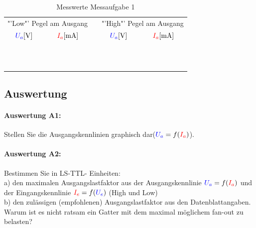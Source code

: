 \documentclass[11pt,a4paper,titlepage,parskip=half]{scrreprt}
\begin{document}
          \begin{center}
            \begin{table}[H]
              \caption{Messwerte Messaufgabe 1}
              \renewcommand{\arraystretch}{1.6}
              \begin{center}
                \begin{tabular}{c|c|c|c|c}
                  \multicolumn{2}{c|}{"'Low"' Pegel am Ausgang} &&\multicolumn{2}{c}{"'High"' Pegel am Ausgang}\\
                  $\textcolor{blue}{U_a} [\si{\volt}]$ & $\textcolor{red}{I_a} [\si{\milli\ampere}] $&& $\textcolor{blue}{U_a} [\si{\volt}]$ & $\textcolor{red}{I_a} [\si{\milli\ampere}] $\\ \hline
                  \qquad\qquad\qquad\qquad & \qquad\qquad\qquad\qquad &  & \qquad\qquad\qquad\qquad & \qquad\qquad\qquad\qquad\\\hline
                   &  &  &  & \\\hline
                   &  &  &  & \\\hline
                   &  &  &  & \\\hline
                   &  &  &  & \\\hline
                   &  &  &  & \\\hline
                   &  &  &  & \\\hline
                   &  &  &  & \\\hline
                   &  &  &  & \\\hline
                   &  &  &  & \\\hline
                   &  &  & &
                \end{tabular}
              \end{center}
            \end{table}
          \end{center}


      \subsection{Auswertung}
        \paragraph{Auswertung A1:} Stellen Sie die Ausgangskennlinien graphisch dar($\textcolor{blue}{U_a} = f(\textcolor{red}{I_a})$).


        \paragraph{Auswertung A2:} Bestimmen Sie in LS-TTL- Einheiten:\\
          a) den maximalen Ausgangslastfaktor aus der Ausgangskennlinie $\textcolor{blue}{U_a} = f(\textcolor{red}{I_a})$ und der Eingangskennlinie $\textcolor{red}{I_e} = f(\textcolor{blue}{U_e})$ (High und Low)\\
          b) den zulässigen (empfohlenen) Ausgangslastfaktor aus den Datenblattangaben.
          Warum ist es nicht ratsam ein Gatter mit dem maximal möglichem fan-out zu belasten?
\end{document}
